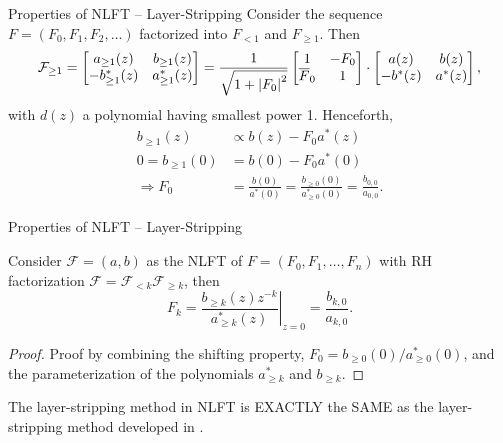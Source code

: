 \begin{frame}{Properties of NLFT -- Layer-Stripping}
    Consider the sequence $F = (F_0,F_1,F_2,\ldots)$ factorized into $F_{<1}$ and $F_{\ge1}$. Then
    \begin{align*}
        \mathcal{F}_{\ge1} = \left[\begin{matrix}
            a_{\ge1}(z) & b_{\ge1}(z) \\ -b_{\ge1}^*(z) & a_{\ge1}^*(z)
        \end{matrix}\right] = \frac{1}{\sqrt{1+\left|{F_0}\right|^2}}\left[\begin{matrix}
            1 & -F_0 \\ \overline{F}_0 & 1
        \end{matrix}\right] \cdot \left[\begin{matrix}
            a(z) & b(z) \\
            -b^*(z) & a^*(z)
        \end{matrix}\right],
    \end{align*}
    with $d(z)$ a polynomial having smallest power 1. Henceforth,
    \begin{align*}
        b_{\ge1}(z) &\propto b(z) - F_0 a^*(z) \\
        0 = b_{\ge1}(0) &= b(0) - F_0 a^*(0) \\
        \Rightarrow F_0 &= \frac{b(0)}{a^*(0)} = \frac{b_{\ge0}(0)}{a_{\ge0}^*(0)} = \frac{b_{0,0}}{a_{0,0}}.
    \end{align*}
\end{frame}
\begin{frame}{Properties of NLFT -- Layer-Stripping}
    \begin{theorem}
        Consider $\mathcal{F}=(a,b)$ as the NLFT of $F = (F_0,F_1,\ldots,F_n)$ with RH factorization $\mathcal{F}=\mathcal{F}_{<k}\mathcal{F}_{\ge k}$, then
        \begin{equation}
            F_k =  \left.\frac{b_{\ge k}(z) z^{-k}}{a_{\ge k}^*(z)}\right|_{z=0} = \frac{b_{k,0}}{a_{k,0}}.
        \end{equation}
    \end{theorem}
    \begin{proof}
        Proof by combining the shifting property, $F_0 = b_{\ge0}(0) / a_{\ge0}^*(0)$, and the parameterization of the polynomials $a_{\ge k}^*$ and $b_{\ge k}$.
    \end{proof}

    The layer-stripping method in NLFT is EXACTLY the SAME as the layer-stripping method developed in \cite{Tsai,GSLW18}.
\end{frame}


